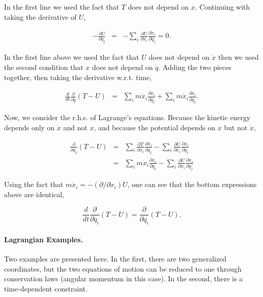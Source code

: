 \documentclass[%
oneside,                 %
final,                   %
10pt]{article}
\begin{document}
In the first line we used the fact that $T$ does not depend on
$x$. Continuing with taking the derivative of $U$,

\begin{eqnarray}
-\frac{\partial U}{\partial\dot{q}_j}&=&-\sum_i\frac{\partial U}{\partial x_i}\frac{\partial x_i}{\partial\dot{q}_j}=0.
\end{eqnarray}

In the first line above we used the fact that $U$ does not depend on $\dot{x}$ then we used the second condition that $x$ does not depend on $\dot{q}$. Adding the two pieces together, then taking the derivative w.r.t. time,

\begin{eqnarray}
\nonumber
\frac{d}{dt}\frac{\partial}{\partial\dot{q}}(T-U)&=&\sum_im\ddot{x}_i\frac{\partial x_i}{\partial q_j}
+\sum_i m\dot{x}_i\frac{\partial\dot{x}_i}{\partial q_j}.
\end{eqnarray}

Now, we consider the r.h.s. of Lagrange's equations. Because the
kinetic energy depends only on $\dot{x}$ and not $x$, and because the
potential depends on $x$ but not $\dot{x}$,

\begin{eqnarray}
\frac{\partial}{\partial q_j}(T-U)&=&\sum_i\frac{\partial T}{\partial\dot{x}_i}\frac{\partial\dot{x_i}}{\partial q_j}
-\sum_i\frac{\partial U}{\partial x_i}\frac{\partial x_i}{\partial q_j}\\
\nonumber
&=&\sum_i m\dot{x}_i\frac{\partial\dot{x_i}}{\partial q_j}
-\sum_i\frac{\partial U}{\partial x_i}\frac{\partial x_i}{\partial q_j}
\end{eqnarray}

Using the fact that $m\ddot{x}_i=-(\partial/\partial x_i)U$, one can
see that the bottom expressions above are identical,

\begin{equation}
\frac{d}{dt}\frac{\partial}{\partial\dot{q}_i}(T-U)=\frac{\partial}{\partial q_i}(T-U).
\end{equation}

\paragraph{Lagrangian Examples.}
Two examples are presented here. In the first, there are two
generalized coordinates, but the two equations of motion can be
reduced to one through conservation laws (angular momentum in this
case). In the second, there is a time-dependent constraint.
\end{document}
